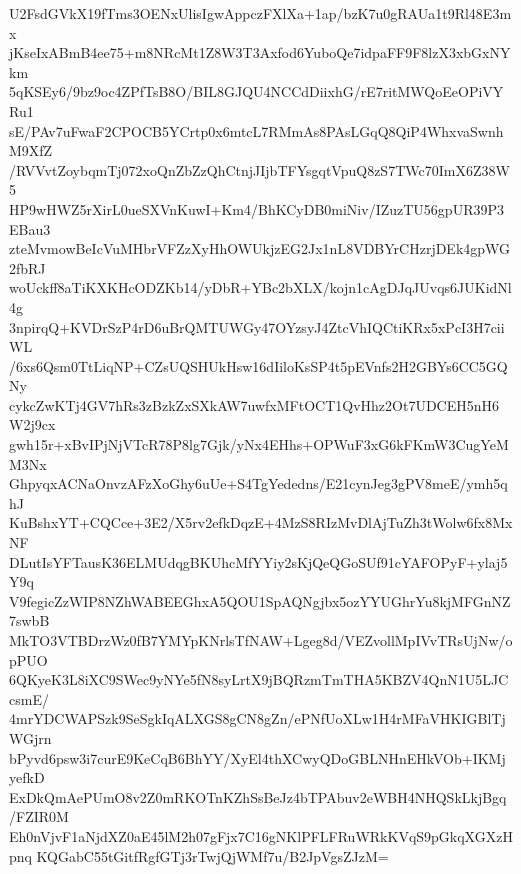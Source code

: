 U2FsdGVkX19fTms3OENxUlisIgwAppczFXlXa+1ap/bzK7u0gRAUa1t9Rl48E3mx
jKseIxABmB4ee75+m8NRcMt1Z8W3T3Axfod6YuboQe7idpaFF9F8lzX3xbGxNYkm
5qKSEy6/9bz9oc4ZPfTsB8O/BIL8GJQU4NCCdDiixhG/rE7ritMWQoEeOPiVYRu1
sE/PAv7uFwaF2CPOCB5YCrtp0x6mtcL7RMmAs8PAsLGqQ8QiP4WhxvaSwnhM9XfZ
/RVVvtZoybqmTj072xoQnZbZzQhCtnjJIjbTFYsgqtVpuQ8zS7TWc70ImX6Z38W5
HP9wHWZ5rXirL0ueSXVnKuwI+Km4/BhKCyDB0miNiv/IZuzTU56gpUR39P3EBau3
zteMvmowBeIcVuMHbrVFZzXyHhOWUkjzEG2Jx1nL8VDBYrCHzrjDEk4gpWG2fbRJ
woUckff8aTiKXKHcODZKb14/yDbR+YBc2bXLX/kojn1cAgDJqJUvqs6JUKidNl4g
3npirqQ+KVDrSzP4rD6uBrQMTUWGy47OYzsyJ4ZtcVhIQCtiKRx5xPcI3H7ciiWL
/6xs6Qsm0TtLiqNP+CZsUQSHUkHsw16dIiloKsSP4t5pEVnfs2H2GBYs6CC5GQNy
cykcZwKTj4GV7hRs3zBzkZxSXkAW7uwfxMFtOCT1QvHhz2Ot7UDCEH5nH6W2j9cx
gwh15r+xBvIPjNjVTcR78P8lg7Gjk/yNx4EHhs+OPWuF3xG6kFKmW3CugYeMM3Nx
GhpyqxACNaOnvzAFzXoGhy6uUe+S4TgYededns/E21cynJeg3gPV8meE/ymh5qhJ
KuBshxYT+CQCce+3E2/X5rv2efkDqzE+4MzS8RIzMvDlAjTuZh3tWolw6fx8MxNF
DLutIsYFTausK36ELMUdqgBKUhcMfYYiy2sKjQeQGoSUf91cYAFOPyF+ylaj5Y9q
V9fegicZzWIP8NZhWABEEGhxA5QOU1SpAQNgjbx5ozYYUGhrYu8kjMFGnNZ7swbB
MkTO3VTBDrzWz0fB7YMYpKNrlsTfNAW+Lgeg8d/VEZvollMpIVvTRsUjNw/opPUO
6QKyeK3L8iXC9SWec9yNYe5fN8syLrtX9jBQRzmTmTHA5KBZV4QnN1U5LJCcsmE/
4mrYDCWAPSzk9SeSgkIqALXGS8gCN8gZn/ePNfUoXLw1H4rMFaVHKIGBlTjWGjrn
bPyvd6psw3i7curE9KeCqB6BhYY/XyEl4thXCwyQDoGBLNHnEHkVOb+IKMjyefkD
ExDkQmAePUmO8v2Z0mRKOTnKZhSsBeJz4bTPAbuv2eWBH4NHQSkLkjBgq/FZIR0M
Eh0nVjvF1aNjdXZ0aE45lM2h07gFjx7C16gNKlPFLFRuWRkKVqS9pGkqXGXzHpnq
KQGabC55tGitfRgfGTj3rTwjQjWMf7u/B2JpVgsZJzM=
